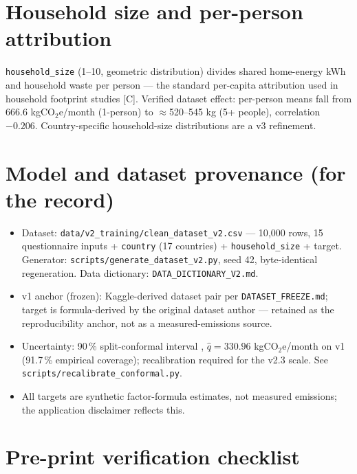 \documentclass[11pt,a4paper]{article}
\begin{document}
\section{Household size and per-person attribution}
\label{sec:household}

\texttt{household\_size} (1--10, geometric distribution) divides shared
home-energy kWh and household waste per person --- the standard
per-capita attribution used in household footprint studies
\cite{ivanova2016, jones2011} [C]. Verified dataset effect: per-person
means fall from 666.6 kgCO$_2$e/month (1-person) to $\approx$520--545 kg
(5+ people), correlation $-0.206$. Country-specific household-size
distributions are a v3 refinement.

\section{Model and dataset provenance (for the record)}
\label{sec:provenance}

\begin{itemize}
  \item Dataset: \texttt{data/v2\_training/clean\_dataset\_v2.csv} ---
        10{,}000 rows, 15 questionnaire inputs + \texttt{country}
        (17 countries) + \texttt{household\_size} + target. Generator:
        \texttt{scripts/generate\_dataset\_v2.py}, seed 42, byte-identical
        regeneration. Data dictionary: \texttt{DATA\_DICTIONARY\_V2.md}.
  \item v1 anchor (frozen): Kaggle-derived dataset pair per
        \texttt{DATASET\_FREEZE.md}; target is formula-derived by the
        original dataset author --- retained as the reproducibility
        anchor, not as a measured-emissions source.
  \item Uncertainty: 90\,\% split-conformal interval
        \cite{lei2018, angelopoulos2021}, $\hat{q} = 330.96$
        kgCO$_2$e/month on v1 (91.7\,\% empirical coverage);
        recalibration required for the v2.3 scale. See
        \texttt{scripts/recalibrate\_conformal.py}.
  \item All targets are synthetic factor-formula estimates, not measured
        emissions; the application disclaimer reflects this.
\end{itemize}

\section{Pre-print verification checklist}
\label{sec:checklist}
\end{document}
